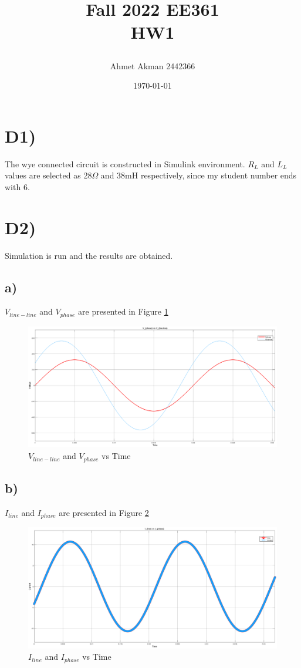 \documentclass[letterpaper,12pt]{article}
\title{

\vspace*{0.5in}
\textbf{Fall 2022 EE361 \\ HW1}
\vspace*{0.25in}
}
\author{Ahmet Akman 2442366\\
       } \date{\today}
\begin{document}
\maketitle

\tableofcontents
\newpage
\section{D1)}
The wye connected circuit is constructed in Simulink environment. $R_L$ and \(L_L\) values are selected as 28\(\Omega\) and 38mH respectively, since my student number ends with 6.
\section{D2)}
Simulation is run and the results are obtained.
\subsection{a)}
\(V_{line-line}\) and \(V_{phase}\) are presented in Figure \ref*{D2a} 
\begin{figure}[H]
    \centering
    \includegraphics[width = 1\textwidth]{2a.png}
    \caption{\(V_{line-line}\) and \(V_{phase}\) vs Time}
    \label{D2a}
\end{figure} 
\subsection{b)}
\(I_{line}\) and \(I_{phase}\) are presented in Figure \ref*{D2b} 
\begin{figure}[H]
    \centering
    \includegraphics[width = 1\textwidth]{2b.png}
    \caption{\(I_{line}\) and \(I_{phase}\) vs Time}
    \label{D2b}
\end{figure} 
\end{document}

